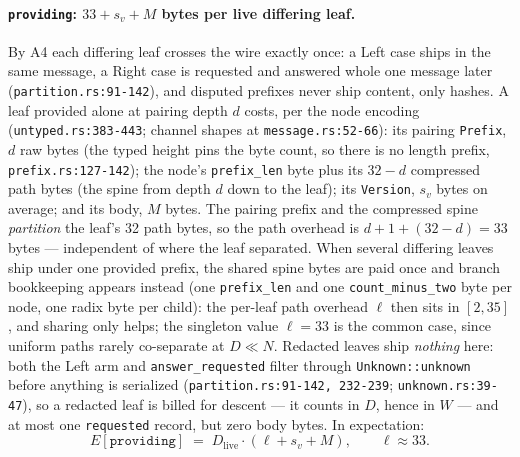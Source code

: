 \documentclass[11pt]{article}
\newcommand{\code}[1]{\texttt{#1}}
\theoremstyle{plain}
\begin{document}
\paragraph{\code{providing}: $33 + s_v + M$ bytes per live differing leaf.}
By A4 each differing leaf crosses the wire exactly once: a Left case ships
in the same message, a Right case is requested and answered whole one
message later (\code{partition.rs:91-142}), and disputed prefixes never
ship content, only hashes. A leaf provided alone at pairing depth $d$
costs, per the node encoding (\code{untyped.rs:383-443}; channel shapes at
\code{message.rs:52-66}): its pairing \code{Prefix}, $d$ raw bytes (the
typed height pins the byte count, so there is no length prefix,
\code{prefix.rs:127-142}); the node's \code{prefix\_len} byte plus its
$32 - d$ compressed path bytes (the spine from depth $d$ down to the
leaf); its \code{Version}, $s_v$ bytes on average; and its body, $M$
bytes. The pairing prefix and the compressed spine \emph{partition} the
leaf's 32 path bytes, so the path overhead is $d + 1 + (32 - d) = 33$
bytes --- independent of where the leaf separated. When several differing
leaves ship under one provided prefix, the shared spine bytes are paid
once and branch bookkeeping appears instead (one \code{prefix\_len} and
one \code{count\_minus\_two} byte per node, one radix byte per child): the
per-leaf path overhead $\ell$ then sits in $[2, 35]$, and sharing only
helps; the singleton value $\ell = 33$ is the common case, since uniform
paths rarely co-separate at $D \ll N$. Redacted leaves ship \emph{nothing}
here: both the Left arm and \code{answer\_requested} filter through
\code{Unknown::unknown} before anything is serialized
(\code{partition.rs:91-142, 232-239}; \code{unknown.rs:39-47}), so a
redacted leaf is billed for descent --- it counts in $D$, hence in
$W$ --- and at most one \code{requested} record, but zero body bytes.
In expectation:
\begin{equation*}
E[\code{providing}] \;=\; D_{\mathrm{live}} \cdot (\ell + s_v + M),
\qquad \ell \approx 33.
\end{equation*}
\end{document}
